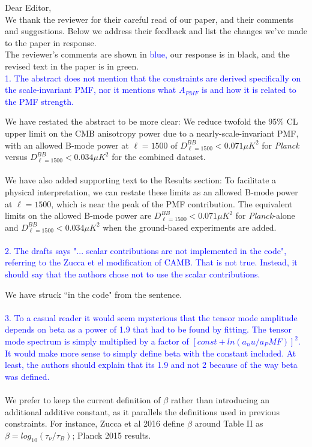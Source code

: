 \documentclass{article}
\newcommand{\planck}{{\sl Planck}}
\newcommand{\reviewer}[1]{\textcolor{Blue}{#1}}
\newcommand{\diff}[1]{\textcolor{PineGreen}{#1}}
\begin{document}
Dear Editor,\\

We thank the reviewer for their  careful read of our paper, and their comments and suggestions. Below we address their feedback and list the changes we've made to the paper in response.\\


The reviewer's comments are shown in \reviewer{blue,} our response is in black, and the revised text in the paper is in \diff{green}. \\

\reviewer{1. The abstract does not mention that the constraints are derived specifically on the scale-invariant PMF, nor it mentions what $A_{PMF}$ is and how it is related to the PMF strength.}

We have restated the abstract to be more clear:
\diff{We reduce twofold the 95\% CL upper limit on the CMB anisotropy power due to a nearly-scale-invariant PMF, with an allowed B-mode power at $\ell=1500$ of $D_{\ell=1500}^{BB} < 0.071 \mu K^2$ for \planck{} versus $D_{\ell=1500}^{BB} < 0.034 \mu K^2$ for the combined dataset. }
\\\\
We have also added supporting text to the Results section:
\diff{To facilitate a physical interpretation, we can restate these limits as an allowed B-mode power  at $\ell=1500$, which is near the peak of the PMF contribution. 
The equivalent limits on the allowed B-mode power are $D_{\ell=1500}^{BB} < 0.071 \mu K^2$ for \planck{}-alone and $D_{\ell=1500}^{BB} < 0.034 \mu K^2$ when the ground-based experiments are added. }
\\\\
\reviewer{2. The drafts says "... scalar contributions are not implemented in the code", referring to the Zucca et el modification of CAMB. That is not true. Instead, it should say that the authors chose not to use the scalar contributions.}

We have struck ``in the code" from the sentence.
\\\\
\reviewer{3. To a casual reader it would seem mysterious that the tensor mode amplitude depends on beta as a power of 1.9 that had to be found by fitting. The tensor mode spectrum is simply multiplied by a factor of $[const+ln(a_nu/a_PMF)]^2$. It would make more sense to simply define beta with the constant included. At least, the authors should explain that its 1.9 and not 2 because of the way beta was defined.}
\\\\
We prefer to keep the current definition of $\beta$ rather than introducing an additional additive constant, as it parallels the definitions used in previous constraints. For instance, Zucca et al 2016 define $\beta$ around Table II as $\beta = log_{10}(\tau_\nu/\tau_B)$; Planck 2015 results. 
\end{document}
